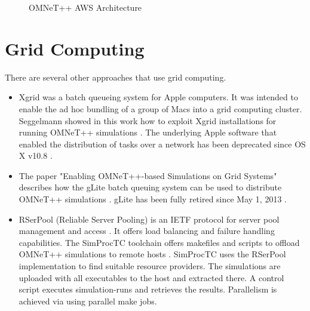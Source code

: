 \begin{figure}[h]
  \centering
  
  \caption{OMNeT++ AWS Architecture}
  \label{fig:omnetppaws}
\end{figure}

\section{Grid Computing}

There are several other approaches that use grid computing.
\begin{itemize}
  \item Xgrid was a batch queueing system for Apple computers. It was intended to enable the ad hoc bundling of a group of Macs into a grid computing cluster. Seggelmann showed in this work how to exploit Xgrid installations for running OMNeT++ simulations \cite{seggelmann2009parallelizing}. The underlying Apple software that enabled the distribution of tasks over a network has been deprecated since OS X v10.8 \cite{wiki:xgrid}.
  
  \item The paper "Enabling OMNeT++-based Simulations on Grid Systems" describes how the gLite batch queuing system can be used to distribute OMNeT++ simulations \cite{kozlovszky2009enabling}. gLite has been fully retired since May 1, 2013 \cite{web:glite}.

  \item RSerPool (Reliable Server Pooling) is an IETF protocol for server pool management and access \cite{dreibholz2008reliable}. It offers load balancing and failure handling capabilities. The SimProcTC toolchain offers makefiles and scripts to offload OMNeT++ simulations to remote hosts \cite{dreibholz2008powerful}. SimProcTC uses the RSerPool implementation to find suitable resource providers. The simulations are uploaded with all executables to the host and extracted there. A control script executes simulation-runs and retrieves the results. Parallelism is achieved via using parallel make jobs.

\end{itemize}
